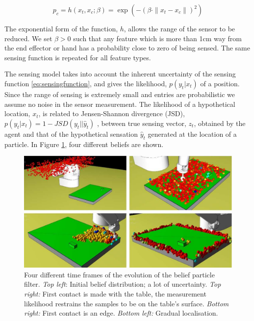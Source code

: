 \begin{equation}\label{eq:sensingfunction}
  p_c = h(x_t,x_c;\beta) = \exp\left( -\left(\beta \cdot \|x_t - x_c\|\right)^2 \right)
\end{equation}

The exponential form of the function, $h$, allows the range of the sensor to be reduced. We set $\beta > 0$ such that 
any feature which is more than 1cm way from the end effector or hand has a probability close to zero of being sensed. 
The same sensing function is repeated for all feature types.

The sensing model takes into account the inherent uncertainty of the sensing function \ref{eq:sensingfunction}, 
and gives the likelihood, $p(y_t|x_t)$ of a position. Since the range of sensing is extremely small and entries are probabilistic 
we assume no noise in the sensor measurement.
The likelihood of a hypothetical location, $x_t$,  is related to Jensen-Shannon divergence (JSD), $p(y_t|x_t) = 1 - JSD(y_t||\hat{y}_t)$ , between true sensing vector,
$z_t$, obtained by the agent and that of the hypothetical sensation $\hat{y}_t$ generated at the location of a particle. In Figure \ref{fig:pf_example}, four 
different beliefs are shown.

\begin{figure}
  \centering
  \includegraphics[width=\textwidth]{./ch3-Search/Figures/particlefilter.pdf}
  \caption{Four different time frames of the evolution of the belief particle filter. \textit{Top left}: Initial belief distribution; a lot of uncertainty.
  \textit{Top right:} First contact is made with the table, the measurement likelihood restrains the samples to be on the table's surface. \textit{Bottom right:}
  First contact is an edge. \textit{Bottom left:} Gradual localisation.}
  \label{fig:pf_example}
\end{figure}

